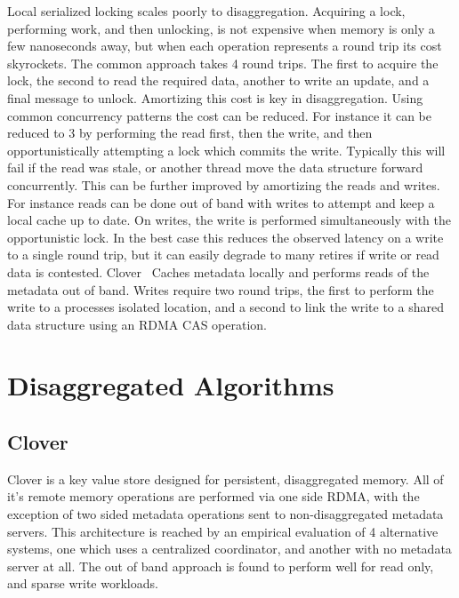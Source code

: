 Local serialized locking scales poorly to disaggregation. Acquiring a lock,
performing work, and then unlocking, is not expensive when memory is only a few
nanoseconds away, but when each operation represents a round trip its cost
skyrockets. The common approach takes 4 round trips. The first to acquire the
lock, the second to read the required data, another to write an update, and a
final message to unlock. Amortizing this cost is key in disaggregation. Using
common concurrency patterns the cost can be reduced. For instance it can be
reduced to 3 by performing the read first, then the write, and then
opportunistically attempting a lock which commits the write. Typically this will
fail if the read was stale, or another thread move the data structure forward
concurrently. This can be further improved by amortizing the reads and writes.
For instance reads can be done out of band with writes to attempt and keep a
local cache up to date. On writes, the write is performed simultaneously with
the opportunistic lock. In the best case this reduces the observed latency on a
write to a single round trip, but it can easily degrade to many retires if write
or read data is contested. Clover~\cite{clover} Caches metadata locally and
performs reads of the metadata out of band. Writes require two round trips, the
first to perform the write to a processes isolated location, and a second to
link the write to a shared data structure using an RDMA CAS operation.

\section{Disaggregated Algorithms}

\subsection{Clover}

Clover is a key value store designed for persistent, disaggregated memory. All
of it's remote memory operations are performed via one side RDMA, with the
exception of two sided metadata operations sent to non-disaggregated metadata
servers. This architecture is reached by an empirical evaluation of 4
alternative systems, one which uses a centralized coordinator, and another with
no metadata server at all. The out of band approach is found to perform well for
read only, and sparse write workloads. 

